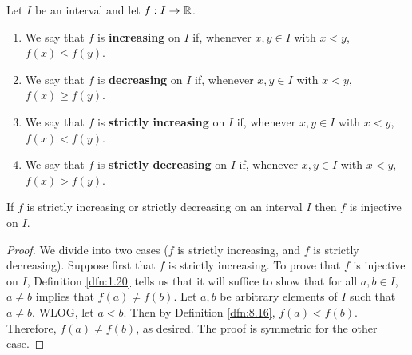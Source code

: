 \documentclass[../main.tex]{subfiles}
\begin{document}
\begin{definition}\label{dfn:8.16}
    Let $I$ be an  interval and let $f:I\to\mathbb{R}$.
    \begin{enumerate}[label={\alph*)}]
        \item We say that $f$ is \textbf{increasing} on $I$ if, whenever $x,y\in I$ with $x<y$, $f(x)\leq f(y)$.
        \item We say that $f$ is \textbf{decreasing} on $I$ if, whenever $x,y\in I$ with $x<y$, $f(x)\geq f(y)$.
        \item We say that $f$ is \textbf{strictly increasing} on $I$ if, whenever $x,y\in I$ with $x<y$, $f(x)<f(y)$.
        \item We say that $f$ is \textbf{strictly decreasing} on $I$ if, whenever $x,y\in I$ with $x<y$, $f(x)>f(y)$.
    \end{enumerate}
\end{definition}

\begin{lemma}\label{lem:8.17}
    If $f$ is strictly increasing or strictly decreasing on an interval $I$ then $f$ is injective on $I$.
    \begin{proof}
        We divide into two cases ($f$ is strictly increasing, and $f$ is strictly decreasing). Suppose first that $f$ is strictly increasing. To prove that $f$ is injective on $I$, Definition \ref{dfn:1.20} tells us that it will suffice to show that for all $a,b\in I$, $a\neq b$ implies that $f(a)\neq f(b)$. Let $a,b$ be arbitrary elements of $I$ such that $a\neq b$. WLOG, let $a<b$. Then by Definition \ref{dfn:8.16}, $f(a)<f(b)$. Therefore, $f(a)\neq f(b)$, as desired. The proof is symmetric for the other case.
    \end{proof}
\end{lemma}
\end{document}
